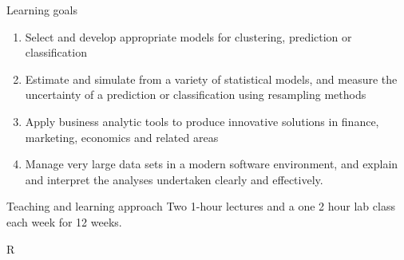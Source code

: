 \documentclass[14pt]{beamer}
\begin{document}
\begin{frame}{Learning goals}\fontsize{13}{14}\sf

\begin{enumerate}
\item Select and develop appropriate models for clustering, prediction or classification
\item Estimate and simulate from a variety of statistical models, and measure the uncertainty of a prediction or classification using resampling methods
\item Apply business analytic tools to produce innovative solutions in finance, marketing, economics and related areas
\item Manage very large data sets in a modern software environment, and explain and interpret the analyses undertaken clearly and effectively.
\end{enumerate}

\pause

\begin{alertblock}{Teaching and learning approach}
Two 1-hour lectures and a one 2 hour lab class each week for 12 weeks.
\end{alertblock}
\end{frame}

\begin{frame}{R}
 


\end{frame}
\end{document}
